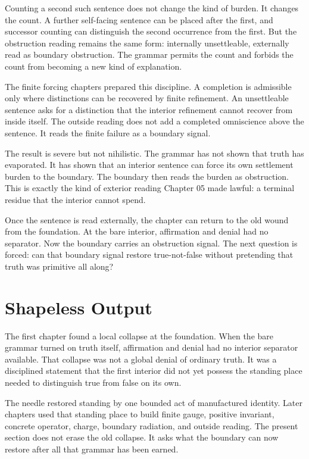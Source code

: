 Counting a second such sentence does not change the kind of burden. It
changes the count. A further self-facing sentence can be placed after the
first, and successor counting can distinguish the second occurrence from the
first. But the obstruction reading remains the same form: internally
unsettleable, externally read as boundary obstruction. The grammar permits
the count and forbids the count from becoming a new kind of explanation.

The finite forcing chapters prepared this discipline. A completion is
admissible only where distinctions can be recovered by finite refinement. An
unsettleable sentence asks for a distinction that the interior refinement
cannot recover from inside itself. The outside reading does not add a
completed omniscience above the sentence. It reads the finite failure as a
boundary signal.

The result is severe but not nihilistic. The grammar has not shown that
truth has evaporated. It has shown that an interior sentence can force its
own settlement burden to the boundary. The boundary then reads the burden as
obstruction. This is exactly the kind of exterior reading Chapter 05 made
lawful: a terminal residue that the interior cannot spend.

Once the sentence is read externally, the chapter can return to the old wound
from the foundation. At the bare interior, affirmation and denial had no
separator. Now the boundary carries an obstruction signal. The next question
is forced: can that boundary signal restore true-not-false without pretending
that truth was primitive all along?

\section{Shapeless Output}

The first chapter found a local collapse at the foundation. When the bare
grammar turned on truth itself, affirmation and denial had no interior
separator available. That collapse was not a global denial of ordinary
truth. It was a disciplined statement that the first interior did not yet
possess the standing place needed to distinguish true from false on its own.

The needle restored standing by one bounded act of manufactured identity.
Later chapters used that standing place to build finite gauge, positive
invariant, concrete operator, charge, boundary radiation, and outside
reading. The present section does not erase the old collapse. It asks what
the boundary can now restore after all that grammar has been earned.

